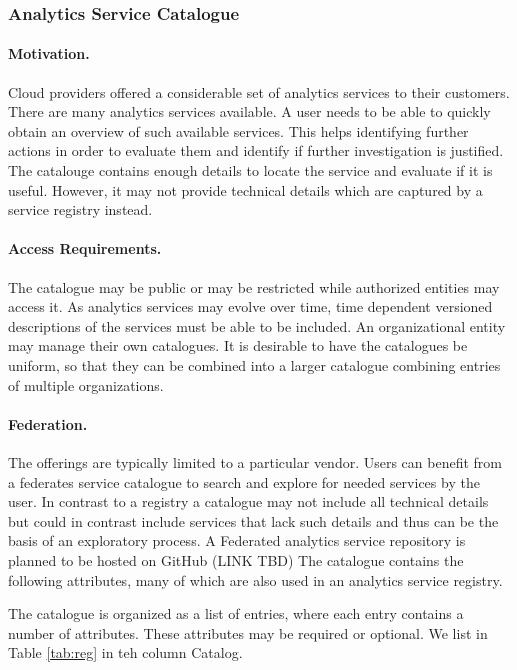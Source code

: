 
\subsubsection{Analytics Service Catalogue}
\label{sec:catalog}

\paragraph*{Motivation.}
Cloud providers offered a considerable set of analytics services to
their customers. There are many analytics services available. A user
needs to be able to quickly obtain an overview of such available
services. This helps identifying further actions in order to evaluate
them and identify if further investigation is justified. The catalouge
contains enough details to locate the service and evaluate if it is
useful. However, it may not provide technical details which are
captured by a service registry instead.

\paragraph*{Access Requirements.}
The catalogue may be public or may be restricted while authorized
entities may access it. As analytics services may evolve over time,
time dependent versioned descriptions of the services must be able to
be included. An organizational entity may manage their own
catalogues. It is desirable to have the catalogues be uniform, so that
they can be combined into a larger catalogue combining entries of
multiple organizations.

\paragraph*{Federation.}
The offerings are typically limited to a particular vendor. Users can
benefit from a federates service catalogue to search and explore for
needed services by the user. In contrast to a registry a catalogue may
not include all technical details but could in contrast include
services that lack such details and thus can be the basis of an
exploratory process.  A Federated analytics service repository is
planned to be hosted on GitHub (LINK TBD) The catalogue contains the
following attributes, many of which are also used in an analytics
service registry.

The catalogue is organized as a list of entries, where each entry
contains a number of attributes. These attributes may be required or
optional. We list in Table \ref{tab:reg} in teh column Catalog.


